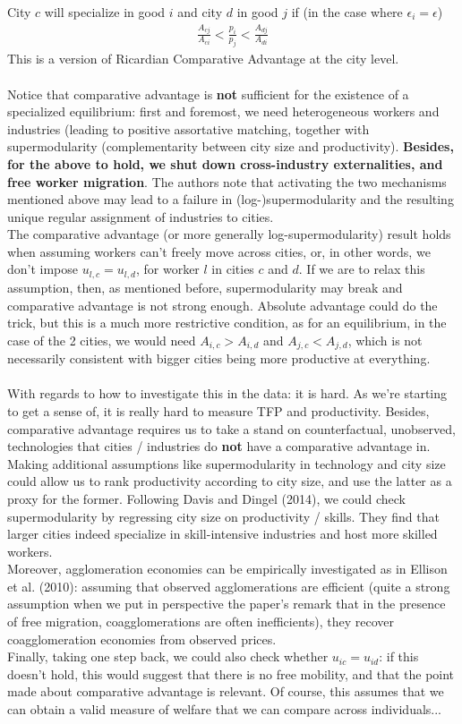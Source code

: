 \documentclass[10pt, final]{article}
\begin{document}
City $c$ will specialize in good $i$ and city $d$ in good $j$ if (in the case where $\epsilon_i = \epsilon$)
\begin{align*}
    \frac{A_{cj}}{A_{ci}} < \frac{p_i}{p_j} < \frac{A_{dj}}{A_{di}} 
\end{align*}
This is a version of Ricardian Comparative Advantage at the city level.
\\
\\
Notice that comparative advantage is \textbf{not} sufficient for the existence of a specialized equilibrium: first and foremost, we need heterogeneous workers and industries (leading to positive assortative matching, together with supermodularity (complementarity between city size and productivity). \textbf{Besides, for the above to hold, we shut down cross-industry externalities, and free worker migration}. The authors note that activating the two mechanisms mentioned above may lead to a failure in (log-)supermodularity and the resulting unique regular assignment of industries to cities.
\\
The comparative advantage (or more generally log-supermodularity) result holds when assuming workers can't freely move across cities, or, in other words, we don't impose $u_{l,c} = u_{l, d}$, for worker $l$ in cities $c$ and $d$. If we are to relax this assumption, then, as mentioned before, supermodularity may break and comparative advantage is not strong enough. Absolute advantage could do the trick, but this is a much more restrictive condition, as for an equilibrium, in the case of the 2 cities, we would need $A_{i,c} > A_{i, d}$ and $A_{j,c} < A_{j,d}$, which is not necessarily consistent with bigger cities being more productive at everything.
\\
\\
With regards to how to investigate this in the data: it is hard. As we're starting to get a sense of, it is really hard to measure TFP and productivity. Besides, comparative advantage requires us to take a stand on counterfactual, unobserved, technologies that cities / industries do \textbf{not} have a comparative advantage in.
\\
Making additional assumptions like supermodularity in technology and city size could allow us to rank productivity according to city size, and use the latter as a proxy for the former. Following Davis and Dingel (2014), we could check supermodularity by regressing city size on productivity / skills. They find that larger cities indeed specialize in skill-intensive industries and host more skilled workers.
\\
Moreover, agglomeration economies can be empirically investigated as in Ellison et al. (2010): assuming that observed agglomerations are efficient (quite a strong assumption when we put in perspective the paper's remark that in the presence of free migration, coagglomerations are often inefficients), they recover coagglomeration economies from observed prices.
\\
Finally, taking one step back, we could also check whether $u_{ic} = u_{id}$: if this doesn't hold, this would suggest that there is no free mobility, and that the point made about comparative advantage is relevant. Of course, this assumes that we can obtain a valid measure of welfare that we can compare across individuals...
\end{document}
